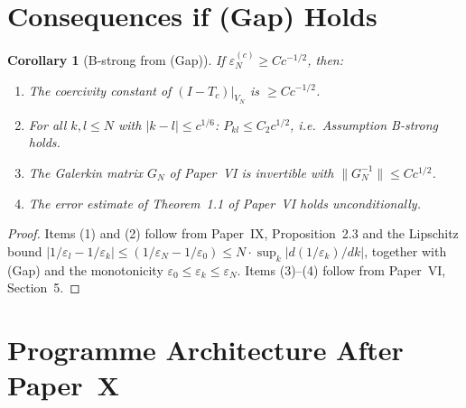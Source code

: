 \documentclass[12pt,a4paper]{article}
\newtheorem{corollary}[theorem]{Corollary}
\newcommand{\Tc}{T_c}
\newcommand{\VN}{V_N}
\begin{document}
\section{Consequences if (Gap) Holds}
\label{sec:consequences}

\begin{corollary}[B-strong from (Gap)]
If $\varepsilon_N^{(c)} \geq Cc^{-1/2}$, then:
\begin{enumerate}[nosep]
  \item The coercivity constant of $(I-\Tc)|_{\VN}$
        is $\geq Cc^{-1/2}$.
  \item For all $k,l \leq N$ with $|k-l| \leq c^{1/6}$:
        $P_{kl} \leq C_2 c^{1/2}$,
        i.e.\ Assumption B-strong holds.
  \item The Galerkin matrix $G_N$ of Paper~VI is
        invertible with $\|G_N^{-1}\| \leq C c^{1/2}$.
  \item The error estimate of Theorem~1.1 of
        Paper~VI holds unconditionally.
\end{enumerate}
\end{corollary}

\begin{proof}
Items (1) and (2) follow from Paper~IX,
Proposition~2.3 and the Lipschitz bound
$|1/\varepsilon_l - 1/\varepsilon_k| \leq
(1/\varepsilon_N - 1/\varepsilon_0) \leq
N \cdot \sup_k |d(1/\varepsilon_k)/dk|$,
together with (Gap) and the monotonicity
$\varepsilon_0 \leq \varepsilon_k \leq \varepsilon_N$.
Items (3)--(4) follow from Paper~VI, Section~5.
\end{proof}

\section{Programme Architecture After Paper~X}
\label{sec:arch}
\end{document}
